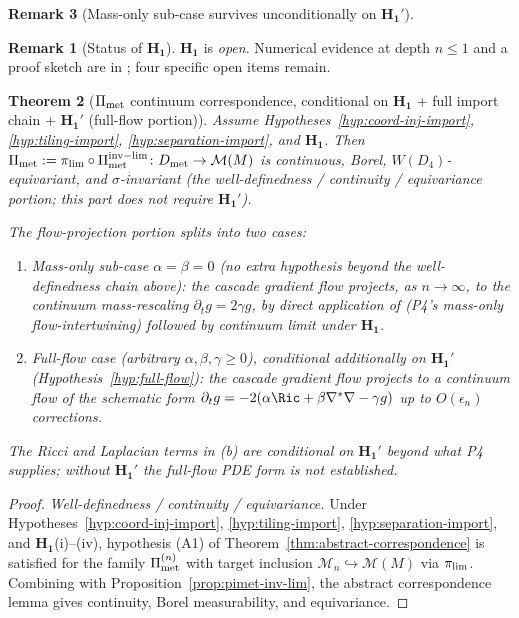 \documentclass[11pt, a4paper]{amsart}
\newtheorem{theorem}{Theorem}[section]
\theoremstyle{definition}
\newtheorem{remark}[theorem]{Remark}
\newcommand{\met}{{\rm met}}
\begin{document}
\begin{remark}[Mass-only sub-case survives unconditionally on $\mathbf{H_1'}$]
\begin{remark}[Status of $\mathbf{H_1}$]
$\mathbf{H_1}$ is \emph{open}. Numerical evidence at depth
$n \leq 1$ and a proof sketch are in \cite[\S C2.bis]{CascadeGR};
four specific open items remain.
\end{remark}

\begin{theorem}[$\Pi_{\met}$ continuum correspondence, conditional
on $\mathbf{H_1}$ + full import chain + $\mathbf{H_1'}$ (full-flow portion)]
\label{thm:pimet-cond}
Assume Hypotheses~\ref{hyp:coord-inj-import}, \ref{hyp:tiling-import},
\ref{hyp:separation-import}, and $\mathbf{H_1}$. Then
$\Pi_{\met} := \pi_{\rm lim} \circ \Pi_{\met}^{\rm inv-lim}
\colon D_{\met} \to \mathcal{M}(M)$ is continuous, Borel,
$W(D_4)$-equivariant, and $\sigma$-invariant (\emph{the
well-definedness / continuity / equivariance portion; this part
does not require $\mathbf{H_1'}$}).

\emph{The flow-projection portion splits into two cases}:
\begin{enumerate}
\item[\textup{(a)}] \emph{Mass-only sub-case} $\alpha = \beta = 0$
  (no extra hypothesis beyond the well-definedness chain above):
  the cascade gradient flow projects, as $n \to \infty$, to the
  continuum mass-rescaling $\partial_t g = 2\gamma g$, by direct
  application of \cite[Thm.~thm:refinement-compat]{CascadeClosureDynamics}
  (P4's mass-only flow-intertwining) followed by continuum limit
  under $\mathbf{H_1}$.
\item[\textup{(b)}] \emph{Full-flow case} (arbitrary $\alpha,
  \beta, \gamma \geq 0$), \emph{conditional additionally on
  $\mathbf{H_1'}$} (Hypothesis~\ref{hyp:full-flow}): the cascade
  gradient flow projects to a continuum flow of the schematic
  form $\partial_t g = -2(\alpha \Ric + \beta \nabla^*\nabla -
  \gamma g)$ up to $O(\epsilon_n)$ corrections.
\end{enumerate}
The Ricci and Laplacian terms in (b) are conditional on
$\mathbf{H_1'}$ beyond what P4 supplies; without $\mathbf{H_1'}$
the full-flow PDE form is not established.
\end{theorem}

\begin{proof}
\emph{Well-definedness / continuity / equivariance.}
Under Hypotheses~\ref{hyp:coord-inj-import},
\ref{hyp:tiling-import}, \ref{hyp:separation-import}, and
$\mathbf{H_1}$(i)--(iv), hypothesis (A1) of
Theorem~\ref{thm:abstract-correspondence} is satisfied for the
family $\Pi_{\met}^{(n)}$ with target inclusion
$\mathcal{M}_n \hookrightarrow \mathcal{M}(M)$ via $\pi_{\rm lim}$.
Combining with Proposition~\ref{prop:pimet-inv-lim}, the abstract
correspondence lemma gives continuity, Borel measurability, and
equivariance.


\end{proof}
\end{remark}
\end{document}
